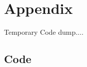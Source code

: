 \documentclass[./main.tex]{subfiles}
\begin{document}
\section{Appendix}
Temporary Code dump....
\subsection{Code}
\end{document}
